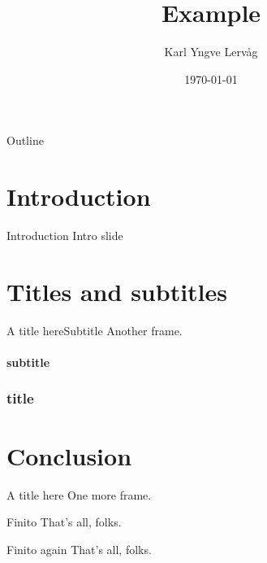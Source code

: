 \documentclass{beamer}
\title{Example}
\author{Karl Yngve Lervåg}
\date{\today}
\begin{document}
\begin{frame}{Outline}
  \tableofcontents
\end{frame}

\section{Introduction}
\begin{frame}{Introduction}
  Intro slide
\end{frame}

\section{Titles and subtitles}
\begin{frame}{A title here}{Subtitle}
  Another frame.
\end{frame}

\begin{frame}
  \framesubtitle{subtitle}
  \frametitle{title}
\end{frame}

\section{Conclusion}
\begin{frame}{A title here}
  One more frame.
\end{frame}
\begin{frame}{Finito}
  That's all, folks.
\end{frame}
\begin{frame}[fragile]{Finito again}
  That's all, folks.
\end{frame}
\end{document}
